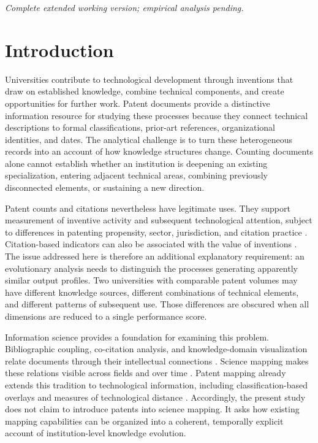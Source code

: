 \noindent\emph{Complete extended working version; empirical analysis pending.}
\section{Introduction}\label{sec:introduction}
Universities contribute to technological development through inventions that draw
on established knowledge, combine technical components, and create opportunities
for further work. Patent documents provide a distinctive information resource for
studying these processes because they connect technical descriptions to formal
classifications, prior-art references, organizational identities, and dates. The
analytical challenge is to turn these heterogeneous records into an account of how
knowledge structures change. Counting documents alone cannot establish whether an
institution is deepening an existing specialization, entering adjacent technical
areas, combining previously disconnected elements, or sustaining a new direction.

Patent counts and citations nevertheless have legitimate uses. They support
measurement of inventive activity and subsequent technological attention, subject
to differences in patenting propensity, sector, jurisdiction, and citation practice
\citep{griliches1990,nagaoka2010,hall2005}. Citation-based indicators can also be
associated with the value of inventions \citep{trajtenberg1990}. The issue addressed
here is therefore an additional explanatory requirement: an evolutionary analysis
needs to distinguish the processes generating apparently similar output profiles.
Two universities with comparable patent volumes may have different knowledge
sources, different combinations of technical elements, and different patterns of
subsequent use. Those differences are obscured when all dimensions are reduced to
a single performance score.

Information science provides a foundation for examining this problem. Bibliographic
coupling, co-citation analysis, and knowledge-domain visualization relate documents
through their intellectual connections \citep{kessler1963,small1973,price1965,borner2003}.
Science mapping makes these relations visible across fields and over time
\citep{chen2006,vaneck2010,rafols2010}. Patent mapping already extends this tradition
to technological information, including classification-based overlays and measures
of technological distance \citep{kay2014,leydesdorff2014,yan2017}. Accordingly, the
present study does not claim to introduce patents into science mapping. It asks how
existing mapping capabilities can be organized into a coherent, temporally explicit
account of institution-level knowledge evolution.

